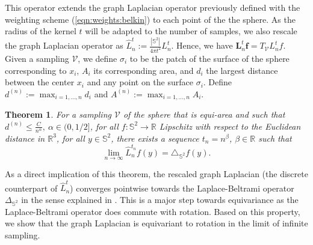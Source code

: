 \documentclass{article} %
\newtheorem{theorem}{Theorem}[section]
\renewcommand{\b}[1]{{\bm{#1}}}  %
\newcommand{\R}{\mathbb{R}}
\renewcommand{\S}{\mathbb{S}}
\newcommand{\V}{\mathcal{V}}  %
\newcommand{\nati}[1]{{\color[rgb]{.3,.5,.9}{#1}}}
\newcommand{\mdeff}[1]{{\color[rgb]{.8,.3,.2}{#1}}}
\newcommand{\eqnref}[1]{(\ref{eqn:#1})}
\newcommand{\linefrac}[2]{
    {#1/#2}
}
\begin{document}
This operator extends the graph Laplacian operator previously defined with the weighting scheme \eqnref{weights:belkin} to each point of the the sphere.
As the radius of the kernel $t$ will be adapted to the number of samples, we also rescale the graph Laplacian operator as $\hat{L}_n^t := \frac{|\mathbb S^2|}{4\pi t^2}L_n^t$.
Hence, we have $\b{L}_n^t \b{f} = T_\V L_n^t f$.
Given a sampling $\V$, we define $\sigma_i$ to be the patch of the surface of the sphere corresponding to $x_i$, $A_i$ its corresponding area, and $d_i$ the largest distance between the center $x_i$ and any point on the surface $\sigma_i$.
Define $d^{(n)} := \max_{i=1, \dots, n} d_i$ and $A^{(n)} := \max_{i=1, \dots, n} A_i$.
\begin{theorem}
	For a sampling $\V$ of the sphere that is equi-area and such that $d^{(n)} \leq \frac{C}{n^\alpha}, \ \alpha\in (0,\linefrac{1}{2}]$, for all $f: \S^2 \rightarrow \R$ Lipschitz with respect to the Euclidean distance in $\R^3$, for all $y\in\S^2$, there exists a sequence $t_n = n^\beta$, $\beta\in\mathbb R$ such that
	\begin{equation*}
		\lim_{n\to\infty}\hat{L}_n^{t_n}f(y) = \triangle_{\S^2}f(y).
	\end{equation*}
	\label{theo:pointwise convergence for a regular sampling}
\end{theorem}
As a direct implication of this theorem, the rescaled graph Laplacian (the discrete counterpart of $\hat L^t_n$) converges pointwise towards the Laplace-Beltrami operator $\Delta_{\S^2}$ in the sense explained in \citep{belkin2007convergence}.
This is a major step towards equivariance as the Laplace-Beltrami operator does commute with rotation. Based on this property, we show that the graph Laplacian is equivariant to rotation in the limit of infinite sampling.
\end{document}
